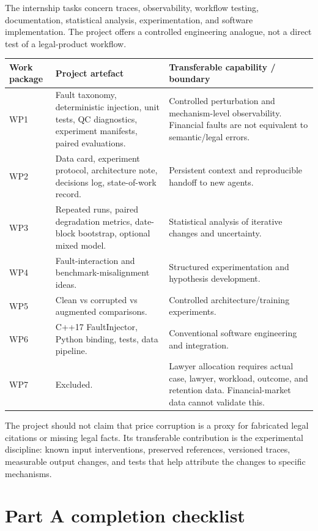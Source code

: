 \documentclass[11pt,a4paper]{article}
\begin{document}
The internship tasks concern traces, observability, workflow testing, documentation, statistical analysis, experimentation, and software implementation. The project offers a controlled engineering analogue, not a direct test of a legal-product workflow.

\begin{longtable}{p{2.1cm}p{5.9cm}p{6.0cm}}
\toprule
\textbf{Work package} & \textbf{Project artefact} & \textbf{Transferable capability / boundary}\\
\midrule
WP1 & Fault taxonomy, deterministic injection, unit tests, QC diagnostics, experiment manifests, paired evaluations. & Controlled perturbation and mechanism-level observability. Financial faults are not equivalent to semantic/legal errors.\\
WP2 & Data card, experiment protocol, architecture note, decisions log, state-of-work record. & Persistent context and reproducible handoff to new agents.\\
WP3 & Repeated runs, paired degradation metrics, date-block bootstrap, optional mixed model. & Statistical analysis of iterative changes and uncertainty.\\
WP4 & Fault-interaction and benchmark-misalignment ideas. & Structured experimentation and hypothesis development.\\
WP5 & Clean vs corrupted vs augmented comparisons. & Controlled architecture/training experiments.\\
WP6 & C++17 FaultInjector, Python binding, tests, data pipeline. & Conventional software engineering and integration.\\
WP7 & Excluded. & Lawyer allocation requires actual case, lawyer, workload, outcome, and retention data. Financial-market data cannot validate this.\\
\bottomrule
\end{longtable}

The project should not claim that price corruption is a proxy for fabricated legal citations or missing legal facts. Its transferable contribution is the experimental discipline: known input interventions, preserved references, versioned traces, measurable output changes, and tests that help attribute the changes to specific mechanisms.

\section{Part A completion checklist}
\label{sec:partA}
\end{document}
